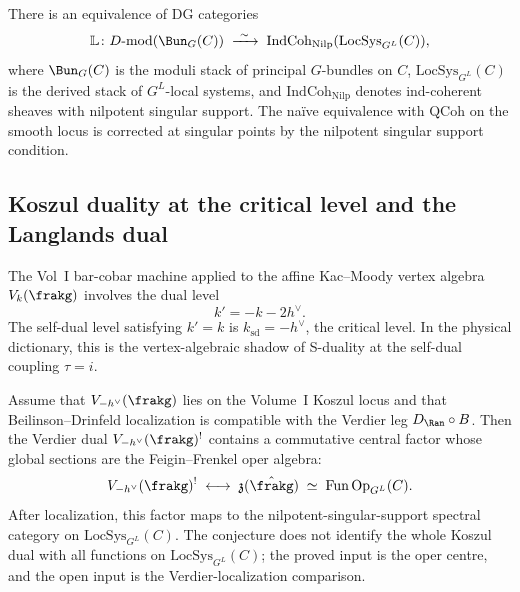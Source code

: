 \begin{theorem}
\label{thm:phys-geom-langlands-gaitsgory}
There is an equivalence of DG categories
\[
 \mathbb{L} \colon D\text{-}\mathrm{mod}(\Bun_G(C)) \;\xrightarrow{\ \sim\ }\;
 \mathrm{IndCoh}_{\mathrm{Nilp}}(\mathrm{LocSys}_{G^L}(C)),
\]
where $\Bun_G(C)$ is the moduli stack of principal $G$-bundles on $C$,
$\mathrm{LocSys}_{G^L}(C)$ is the derived stack of $G^L$-local systems, and
$\mathrm{IndCoh}_{\mathrm{Nilp}}$ denotes ind-coherent sheaves with nilpotent
singular support. The na\"ive equivalence with $\mathrm{QCoh}$ on the smooth
locus is corrected at singular points by the nilpotent singular support
condition.
\end{theorem}

\subsection{Koszul duality at the critical level and the Langlands dual}
\label{subsec:phys-koszul-critical-langlands}

The Vol~I bar-cobar machine applied to the affine Kac--Moody vertex algebra
$V_k(\frakg)$ involves the dual level
\begin{equation}\label{eq:phys-dual-level}
 k' = -k - 2h^\vee.
\end{equation}
The self-dual level satisfying $k' = k$ is $k_{\mathrm{sd}} = -h^\vee$, the
critical level. In the physical dictionary, this is the vertex-algebraic
shadow of S-duality at the self-dual coupling $\tau = i$.

\begin{conjecture}
\label{prop:phys-koszul-critical}
\ClaimStatusConjectured
Assume that $V_{-h^\vee}(\frakg)$ lies on the Volume~I Koszul locus and
that Beilinson--Drinfeld localization is compatible with the Verdier leg
$D_{\Ran}\circ B$. Then the Verdier dual $V_{-h^\vee}(\frakg)^!$ contains a
commutative central factor whose global sections are the Feigin--Frenkel
oper algebra:
\[
 V_{-h^\vee}(\frakg)^! \;\longleftrightarrow\; \mathfrak{z}(\hat{\frakg})
 \;\simeq\; \mathrm{Fun}\,\mathrm{Op}_{G^L}(C).
\]
After localization, this factor maps to the nilpotent-singular-support
spectral category on $\mathrm{LocSys}_{G^L}(C)$. The conjecture does not
identify the whole Koszul dual with all functions on $\mathrm{LocSys}_{G^L}(C)$;
the proved input is the oper centre, and the open input is the Verdier-localization
comparison.
\end{conjecture}

